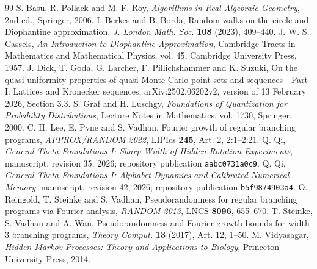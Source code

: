 \begin{thebibliography}{99}
 S. Basu, R. Pollack and M.-F. Roy,
\emph{Algorithms in Real Algebraic Geometry}, 2nd ed., Springer, 2006.
 I. Berkes and B. Borda,
Random walks on the circle and Diophantine approximation,
\emph{J. London Math. Soc.} \textbf{108} (2023), 409--440.
 J. W. S. Cassels,
\emph{An Introduction to Diophantine Approximation}, Cambridge Tracts in Mathematics and Mathematical Physics, vol. 45, Cambridge University Press, 1957.
 J. Dick, T. Goda, G. Larcher, F. Pillichshammer and K. Suzuki,
On the quasi-uniformity properties of quasi-Monte Carlo point sets and sequences---Part I: Lattices and Kronecker sequences,
arXiv:2502.06202v2, version of 13 February 2026, Section 3.3.
 S. Graf and H. Luschgy,
\emph{Foundations of Quantization for Probability Distributions}, Lecture Notes in Mathematics, vol. 1730, Springer, 2000.
 C. H. Lee, E. Pyne and S. Vadhan,
Fourier growth of regular branching programs,
\emph{APPROX/RANDOM 2022}, LIPIcs \textbf{245}, Art. 2, 2:1--2:21.
 Q. Qi,
\emph{General Theta Foundations I: Sharp Width of Hidden Rotation Experiments}, manuscript, revision 35, 2026; repository publication \texttt{aabc0731a0c9}.
 Q. Qi,
\emph{General Theta Foundations I: Alphabet Dynamics and Calibrated Numerical Memory}, manuscript, revision 42, 2026; repository publication \texttt{b5f9874903a4}.
 O. Reingold, T. Steinke and S. Vadhan,
Pseudorandomness for regular branching programs via Fourier analysis,
\emph{RANDOM 2013}, LNCS \textbf{8096}, 655--670.
 T. Steinke, S. Vadhan and A. Wan,
Pseudorandomness and Fourier growth bounds for width 3 branching programs,
\emph{Theory Comput.} \textbf{13} (2017), Art. 12, 1--50.
 M. Vidyasagar,
\emph{Hidden Markov Processes: Theory and Applications to Biology}, Princeton University Press, 2014.


\end{thebibliography}
